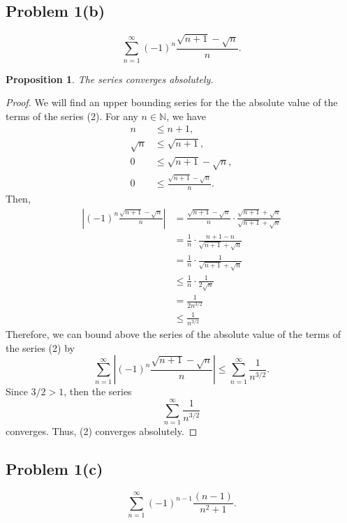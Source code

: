 \documentclass[12pt]{article}
\newtheorem{proposition}{Proposition}
\newenvironment{problem}
    {\begin{lrbox}{\mybox}\begin{minipage}{0.98\textwidth}}
    {\end{minipage}\end{lrbox}\framebox[\textwidth]{\usebox{\mybox}}}
\newcommand{\N}{\mathbb{N}} %
\newcommand{\<}{\left\langle} %
\renewcommand{\>}{\right\rangle} %
\begin{document}
\subsection*{Problem 1(b)}
\begin{problem}
    \begin{equation}
        \sum_{n=1}^\infty (-1)^n\frac{\sqrt{n+1} - \sqrt{n}}{n}.
    \end{equation}
\end{problem}

\begin{proposition}
    The series converges absolutely.
\end{proposition}

\begin{proof}
    We will find an upper bounding series for the the absolute value of the terms of the series (2). For any $n \in \N$, we have
    \begin{align*}
        n &\leq n + 1, \\
        \sqrt{n} &\leq \sqrt{n + 1}, \\
        0 &\leq \sqrt{n + 1} - \sqrt{n}, \\
        0 &\leq \frac{\sqrt{n + 1} - \sqrt{n}}{n}.
    \end{align*}
    Then,
    \begin{align*}
        \left| (-1)^n\frac{\sqrt{n+1} - \sqrt{n}}{n} \right| 
            &=  \frac{\sqrt{n + 1} - \sqrt{n}}{n} \cdot \frac{\sqrt{n + 1} + \sqrt{n}}{\sqrt{n + 1} + \sqrt{n}} \\
            &= \frac1n \cdot \frac{n + 1 - n}{\sqrt{n + 1} + \sqrt{n}} \\
            &= \frac1n \cdot \frac{1}{\sqrt{n + 1} + \sqrt{n}} \\
            &\leq \frac1n \cdot \frac{1}{2\sqrt{n}} \\
            &= \frac1{2 n^{3/2}} \\
            &\leq \frac1{n^{3/2}}
    \end{align*}
    Therefore, we can bound above the series of the absolute value of the terms of the series (2) by
    \[
        \sum_{n=1}^\infty \left| (-1)^n\frac{\sqrt{n+1} - \sqrt{n}}{n} \right| \leq \sum_{n=1}^\infty \frac1{n^{3/2}}.
    \]
    Since $3/2 > 1$, then the series
    \[
        \sum_{n=1}^\infty \frac1{n^{3/2}}
    \]
    converges. Thus, (2) converges absolutely.
    
    
\end{proof}

\newpage
\subsection*{Problem 1(c)}
\begin{problem}
    \begin{equation}
        \sum_{n=1}^\infty (-1)^{n-1}\frac{(n-1)}{n^2+1}.
    \end{equation}
\end{problem}
\end{document}
